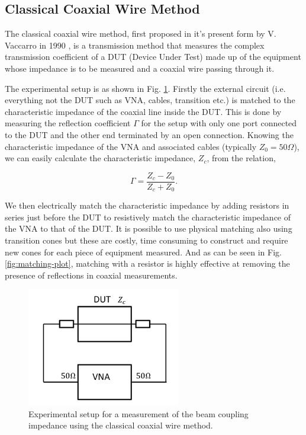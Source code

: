 \subsection{Classical Coaxial Wire Method}

The classical coaxial wire method, first proposed in it's present form by V. Vaccarro in 1990 \cite{Vaccaro:ImprovedWireMeth}, is a transmission method that measures the complex transmission coefficient of a DUT (Device Under Test) made up of the equipment whose impedance is to be measured and a coaxial wire passing through it. 

The experimental setup is as shown in Fig. \ref{fig:classic-coax}. Firstly the external circuit (i.e. everything not the DUT such as VNA, cables, transition etc.) is matched to the characteristic impedance of the coaxial line inside the DUT. This is done by measuring the reflection coefficient $\Gamma$ for the setup with only one port connected to the DUT and the other end terminated by an open connection. Knowing the characteristic impedance of the VNA and associated cables (typically $Z_{0} = 50\Omega$), we can easily calculate the characteristic impedance, $Z_{c}$, from the relation,

\begin{equation}
\Gamma = \frac{Z_{c} - Z_{0}}{Z_{c} + Z_{0}}.
\end{equation}

We then electrically match the characteristic impedance by adding resistors in series just before the DUT to resistively match the characteristic impedance of the VNA to that of the DUT. It is possible to use physical matching also using transition cones but these are costly, time consuming to construct and require new cones for each piece of equipment measured. And as can be seen in Fig. \ref{fig:matching-plot}, matching with a resistor is highly effective at removing the presence of reflections in coaxial measurements.

\begin{figure}
\begin{center}
\includegraphics[width=0.6\textwidth]{Bench_Top_Measurements/figures/wire_meas_single_wire.pdf}
\end{center}
\caption{Experimental setup for a measurement of the beam coupling impedance using the classical coaxial wire method.}
\label{fig:classic-coax}
\end{figure} 

